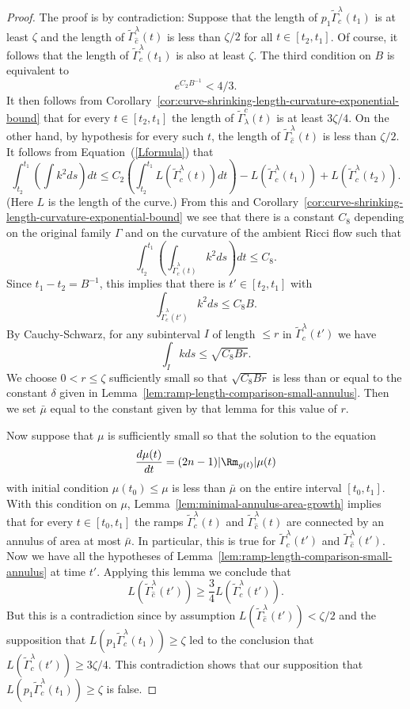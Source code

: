 \begin{proof}
The proof is by contradiction: Suppose that the length of
$p_1\widetilde\Gamma_c^\lambda(t_1)$ is at least $\zeta$ and the
length of $\widetilde\Gamma_{\hat c}^\lambda(t)$ is less than
$\zeta/2$ for all $t\in [t_2,t_1]$. Of course, it follows that the
length of $\widetilde\Gamma_c^\lambda(t_1)$ is also at least
$\zeta$. The third condition on $B$ is equivalent to
$$e^{C_2B^{-1}}<4/3.$$
It then follows from
 Corollary~\ref{cor:curve-shrinking-length-curvature-exponential-bound} that for every $t\in
 [t_2,t_1]$ the length of $\widetilde\Gamma^c_\lambda(t)$ is at least $3\zeta/4$.
On the other hand, by hypothesis for every such $t$, the length of
$\widetilde\Gamma_{\hat c}^\lambda(t)$ is less than $\zeta/2$. It
follows from Equation~(\ref{Lformula}) that
$$\int_{t_2}^{t_1}\left(\int k^2ds\right)dt\le
C_2\left(\int_{t_2}^{t_1}L(\widetilde\Gamma_c^\lambda(t))dt\right)-
L(\widetilde\Gamma_c^\lambda(t_1))+L(\widetilde\Gamma_c^\lambda(t_2)).$$
(Here $L$ is the length of the curve.) From this and
Corollary~\ref{cor:curve-shrinking-length-curvature-exponential-bound} we see that there is a constant $C_8$
depending on the original family $\Gamma$ and on the curvature of
the ambient Ricci flow such that
$$\int_{t_2}^{t_1}\left(\int_{\widetilde\Gamma_c^\lambda(t)} k^2ds\right)dt\le C_8.$$
Since $t_1-t_2=B^{-1}$, this implies that there is $t'\in [t_2,t_1]$
with
$$\int_{\widetilde\Gamma_c^\lambda(t')}k^2ds\le C_8B.$$
By Cauchy-Schwarz, for any subinterval $I$ of length $\le r$ in
$\widetilde\Gamma_c^\lambda(t')$ we have
$$\int_Ikds\le \sqrt{C_8Br}.$$
We choose $0<r\le \zeta$ sufficiently small so that $\sqrt{C_8Br}$
is less than or equal to the constant $\delta$ given in
Lemma~\ref{lem:ramp-length-comparison-small-annulus}. Then we set $\bar \mu$ equal to the constant
given by that lemma for this value of $r$.

Now suppose that $\mu$ is sufficiently small so that the solution to
the equation
$$\frac{d\mu(t)}{dt}=(2n-1)|\Rm_{g(t)}|\mu(t)$$
with initial condition $\mu(t_0)\le \mu$ is less than $\bar\mu$ on
the entire interval $[t_0,t_1]$. With this condition on $\mu$,
Lemma~\ref{lem:minimal-annulus-area-growth} implies that for every $t\in [t_0,t_1]$ the
ramps $\widetilde\Gamma_c^\lambda(t)$ and $\widetilde\Gamma_{\hat
c}^\lambda(t)$ are connected by an annulus of area at most
$\bar\mu$. In particular, this is true for
$\widetilde\Gamma_c^\lambda(t')$ and $\widetilde\Gamma_{\hat
c}^\lambda(t')$. Now we have all the hypotheses of Lemma~\ref{lem:ramp-length-comparison-small-annulus}
at time $t'$. Applying this lemma we conclude that
$$L(\widetilde\Gamma_{\hat c}^\lambda(t'))\ge \frac{3}{4}L(\widetilde\Gamma_c^\lambda(t')).$$
But this is a contradiction since by assumption
$L(\widetilde\Gamma_{\hat c}^\lambda(t'))<\zeta/2$ and the
supposition that $L(p_1\widetilde\Gamma_c^\lambda(t_1))\ge \zeta$
led to the conclusion that $L(\widetilde\Gamma_c^\lambda(t'))\ge
3\zeta/4$. This contradiction shows that our supposition that
$L(p_1\widetilde\Gamma_c^\lambda(t_1))\ge \zeta$ is false.
\end{proof}

